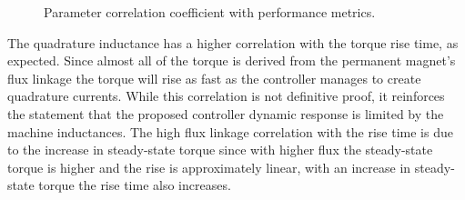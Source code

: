 \begin{figure}[!htb]
	\begin{subfigmatrix}{2}
	\end{subfigmatrix}
	\begin{subfigmatrix}{1}
	\end{subfigmatrix}
	\caption{Parameter correlation coefficient with performance metrics.}
	\label{fig:corr_plot}%
\end{figure}

The quadrature inductance has a higher correlation with the torque rise time, as expected. Since almost all of the torque is derived from the permanent magnet's flux linkage the torque will rise as fast as the controller manages to create quadrature currents. While this correlation is not definitive proof, it reinforces the statement that the proposed controller dynamic response is limited by the machine inductances. The high flux linkage correlation with the rise time is due to the increase in steady-state torque since with higher flux the steady-state torque is higher and the rise is approximately linear, with an increase in steady-state torque the rise time also increases.

